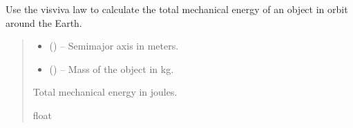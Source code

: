 \documentclass[letterpaper,10pt,english]{sphinxmanual}
\begin{document}

\begin{fulllineitems}
\label{\detokenize{fspsim.utils:fspsim.utils.Conversions.calculate_energy_from_semi_major_axis}}
\pysigstartsignatures
{}
\pysigstopsignatures
\sphinxAtStartPar
Use the vis\sphinxhyphen{}viva law to calculate the total mechanical energy of an object in orbit around the Earth.
\begin{quote}\begin{description}
\begin{itemize}
\item {} 
\sphinxAtStartPar
{} () – Semi\sphinxhyphen{}major axis in meters.

\item {} 
\sphinxAtStartPar
{} () – Mass of the object in kg.

\end{itemize}

\sphinxAtStartPar
Total mechanical energy in joules.

\sphinxAtStartPar
float

\end{description}\end{quote}

\end{fulllineitems}

\end{document}
